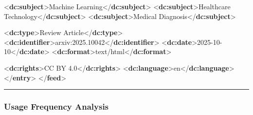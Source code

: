 \documentclass[
  letterpaper,
  DIV=11,
  numbers=noendperiod]{scrartcl}
\newenvironment{Shaded}{\begin{snugshade}}{\end{snugshade}}
\newcommand{\KeywordTok}[1]{\textcolor[rgb]{0.00,0.23,0.31}{\textbf{#1}}}
\newcommand{\NormalTok}[1]{\textcolor[rgb]{0.00,0.23,0.31}{#1}}
\begin{document}
\begin{Shaded}
\begin{Highlighting}[]
\NormalTok{    \textless{}}\KeywordTok{dc:subject}\NormalTok{\textgreater{}Machine Learning\textless{}/}\KeywordTok{dc:subject}\NormalTok{\textgreater{}}
\NormalTok{    \textless{}}\KeywordTok{dc:subject}\NormalTok{\textgreater{}Healthcare Technology\textless{}/}\KeywordTok{dc:subject}\NormalTok{\textgreater{}}
\NormalTok{    \textless{}}\KeywordTok{dc:subject}\NormalTok{\textgreater{}Medical Diagnosis\textless{}/}\KeywordTok{dc:subject}\NormalTok{\textgreater{}}
    
\NormalTok{ \textless{}}\KeywordTok{dc:type}\NormalTok{\textgreater{}Review Article\textless{}/}\KeywordTok{dc:type}\NormalTok{\textgreater{}}
\NormalTok{    \textless{}}\KeywordTok{dc:identifier}\NormalTok{\textgreater{}arxiv:2025.10042\textless{}/}\KeywordTok{dc:identifier}\NormalTok{\textgreater{}}
\NormalTok{    \textless{}}\KeywordTok{dc:date}\NormalTok{\textgreater{}2025{-}10{-}10\textless{}/}\KeywordTok{dc:date}\NormalTok{\textgreater{}}
\NormalTok{    \textless{}}\KeywordTok{dc:format}\NormalTok{\textgreater{}text/html\textless{}/}\KeywordTok{dc:format}\NormalTok{\textgreater{}}
    
\NormalTok{    \textless{}}\KeywordTok{dc:rights}\NormalTok{\textgreater{}CC BY 4.0\textless{}/}\KeywordTok{dc:rights}\NormalTok{\textgreater{}}
\NormalTok{    \textless{}}\KeywordTok{dc:language}\NormalTok{\textgreater{}en\textless{}/}\KeywordTok{dc:language}\NormalTok{\textgreater{}}
\NormalTok{  \textless{}/}\KeywordTok{entry}\NormalTok{\textgreater{}}
\NormalTok{\textless{}/}\KeywordTok{feed}\NormalTok{\textgreater{}}
\end{Highlighting}
\end{Shaded}

\begin{center}\rule{0.5\linewidth}{0.5pt}\end{center}

\subsubsection{Usage Frequency Analysis}\label{usage-frequency-analysis}
\end{document}
